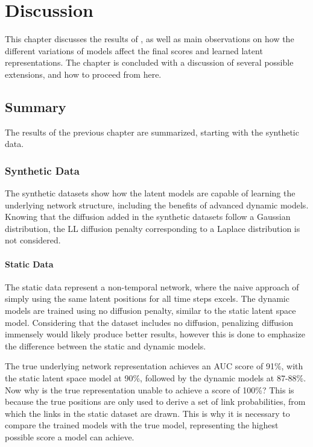 \chapter{Discussion}\label{ch:Discussion}

This chapter discusses the results of , as well as main observations on how the different variations of models affect the final scores and learned latent representations. The chapter is concluded with a discussion of several possible extensions, and how to proceed from here.

\section{Summary}

    The results of the previous chapter are summarized, starting with the synthetic data. 

    \subsection{Synthetic Data}
    
        The synthetic datasets show how the latent models are capable of learning the underlying network structure, including the benefits of advanced dynamic models. Knowing that the diffusion added in the synthetic datasets follow a Gaussian distribution, the LL diffusion penalty corresponding to a Laplace distribution is not considered.
        
        \subsubsection{Static Data}
        
            The static data represent a non-temporal network, where the naive approach of simply using the same latent positions for all time steps excels. The dynamic models are trained using no diffusion penalty, similar to the static latent space model. Considering that the dataset includes no diffusion, penalizing diffusion immensely would likely produce better results, however this is done to emphasize the difference between the static and dynamic models.
            
            The true underlying network representation achieves an AUC score of 91\%, with the static latent space model at 90\%, followed by the dynamic models at 87-88\%. Now why is the true representation unable to achieve a score of 100\%? This is because the true positions are only used to derive a set of link probabilities, from which the links in the static dataset are drawn. This is why it is necessary to compare the trained models with the true model, representing the highest possible score a model can achieve.
        
